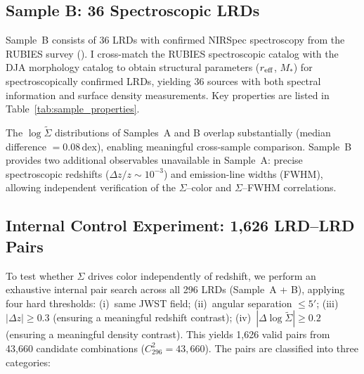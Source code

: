 \documentclass[apj,twocolumn,longbibliography,linenumbers]{aastex701}
\begin{document}
\subsection{Sample B: 36 Spectroscopic LRDs}

Sample~B consists of 36 LRDs with confirmed NIRSpec spectroscopy from the RUBIES survey (\citealt{Hviding2024}). I cross-match the RUBIES spectroscopic catalog with the DJA morphology catalog to obtain structural parameters ($r_{\rm eff}$, $M_*$) for spectroscopically confirmed LRDs, yielding 36 sources with both spectral information and surface density measurements. Key properties are listed in Table~\ref{tab:sample_properties}.

The $\log\tilde\Sigma$ distributions of Samples~A and B overlap substantially (median difference $= 0.08$\,dex), enabling meaningful cross-sample comparison. Sample~B provides two additional observables unavailable in Sample~A: precise spectroscopic redshifts ($\Delta z/z \sim 10^{-3}$) and emission-line widths (FWHM), allowing independent verification of the $\Sigma$--color and $\Sigma$--FWHM correlations.

\subsection{Internal Control Experiment: 1,626 LRD--LRD Pairs}

To test whether $\Sigma$ drives color independently of redshift, we perform an exhaustive internal pair search across all 296 LRDs (Sample~A + B), applying four hard thresholds: (i)~same JWST field; (ii)~angular separation $\leq 5'$; (iii)~$|\Delta z| \geq 0.3$ (ensuring a meaningful redshift contrast); (iv)~$|\Delta\log\tilde\Sigma| \geq 0.2$ (ensuring a meaningful density contrast). This yields 1,626 valid pairs from 43,660 candidate combinations ($C_{296}^{2} = 43{,}660$). The pairs are classified into three categories:

\begin{table}[h]
\caption{Classification of 1,626 Matched Pairs}
\label{tab:pairs_classification}
\centering
\small
{}
\end{table}
\end{document}
